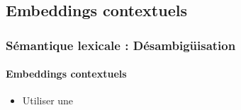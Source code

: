 \documentclass[xcolor=table]{beamer}
\begin{document}
\subsection{Embeddings contextuels}

\begin{frame}
\frametitle{Sémantique lexicale : Désambigüisation}
\framesubtitle{Embeddings contextuels}

\begin{itemize}
	\item Utiliser une 
\end{itemize}

\end{frame}

\end{document}
